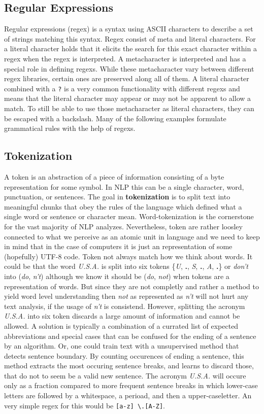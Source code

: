 \subsection{Regular Expressions}
Regular expressions (\gls{regex}) is a syntax using ASCII characters to describe a set of strings matching this syntax. Regex consist of meta and literal characters. For a literal character holds that it elicits the search for this exact character within a regex when the regex is interpreted. A metacharacter is interpreted and has a special role in defining regexs. While these metacharacter vary between different regex libraries, certain ones are preserved along all of them. A literal character combined with a \texttt{?} is a very common functionality with different regexs and means that the literal character may appear or may not be apparent to allow a match. To still be able to use those metacharacter as literal characters, they can be escaped with a backslash. Many of the following examples formulate grammatical rules with the help of regexs.

\subsection{Tokenization}
A token is an abstraction of a piece of information consisting of a byte representation for some symbol. In NLP this can be
a single character, word, punctuation, or sentences. The goal in \textbf{tokenization} is
to split text into meaningful chunks that obey the rules of the language which defined
what a single word or sentence or character mean. Word-tokenization is the cornerstone for the vast majority of NLP analyzes.
Nevertheless, token are rather loosley connected to what we perceive as an atomic unit in language and we need to keep in mind that in the case of computers it is just an representation of some (hopefully) UTF-8 code. Token not always match how we think about words. It could be that the word \textit{U.S.A.} is split into six tokens \{\textit{U}, \textbf{.}, \textit{S}, \textbf{.}, \textit{A}, \textbf{.}\} or \textit{don't} into (\textit{do}, \textit{n't}) although we know it should be (\textit{do}, \textit{not}) when tokens are a representation of words. But since they are not completly and rather a method to yield word level understanding then \textit{not} as represented as \textit{n't} will not hurt any text analysis, if the usage of \textit{n't} is consistend. However, splitting the acronym \textit{U.S.A.} into six token discards a large amount of information and cannot be allowed. A solution is typically a combination of a currated list of expected abbreviations and special cases that can be confused for the ending of a sentence by an algorithm. Or, one could train text with a unsupervised method that detects sentence boundary. By counting occurences of ending a sentence, this method extracts the most occuring sentence breaks, and learns to discard those, that do not to seem be a valid new sentence. The acronym \textit{U.S.A.} will occure only as a fraction compared to more frequent sentence breaks in which lower-case letters are followed by a whitespace, a perioad, and then a upper-caseletter. An very simple regex for this would be \texttt{[a-z] \textbackslash.[A-Z]}.

